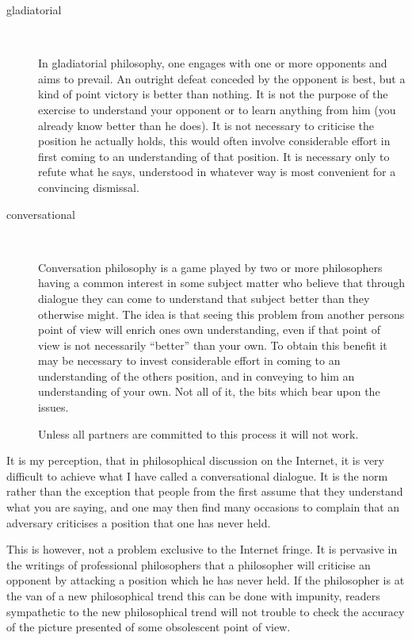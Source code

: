 \documentclass{article}
\begin{document}
\begin{description}

\item[gladiatorial] \ 

In gladiatorial philosophy, one engages with one or more opponents and aims to prevail.
An outright defeat conceded by the opponent is best, but a kind of point victory is better than nothing.
It is not the purpose of the exercise to understand your opponent or to learn anything from him (you already know better than he does).
It is not necessary to criticise the position he actually holds, this would often involve considerable effort in first coming to an understanding of that position.
It is necessary only to refute what he says, understood in whatever way is most convenient for a convincing dismissal.

\item[conversational] \ 

Conversation philosophy is a game played by two or more philosophers having a common interest in some subject matter who believe that through dialogue they can come to understand that subject better than they otherwise might.
The idea is that seeing this problem from another persons point of view will enrich ones own understanding, even if that point of view is not necessarily ``better'' than your own.
To obtain this benefit it may be necessary to invest considerable effort in coming to an understanding of the others position, and in conveying to him an understanding of your own.
Not all of it, the bits which bear upon the issues.

Unless all partners are committed to this process it will not work.
\end{description}

It is my perception, that in philosophical discussion on the Internet, it is very difficult to achieve what I have called a conversational dialogue.
It is the norm rather than the exception that people from the first assume that they understand what you are saying, and one may then find many occasions to complain that an adversary criticises a position that one has never held.

This is however, not a problem exclusive to the Internet fringe.
It is pervasive in the writings of professional philosophers that a philosopher will criticise an opponent by attacking a position which he has never held.
If the philosopher is at the van of a new philosophical trend this can be done with impunity, readers sympathetic to the new philosophical trend will not trouble to check the accuracy of the picture presented of some obsolescent point of view.
\end{document}
